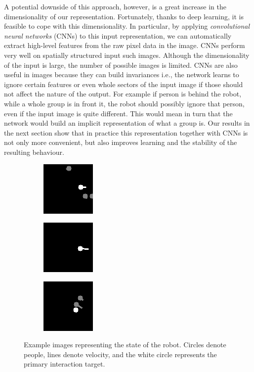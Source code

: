 \documentclass[letterpaper, 10 pt, conference]{ieeeconf}
\begin{document}
A potential downside of this approach, however, is a great increase in the dimensionality of our representation.  Fortunately, thanks to deep learning, it is feasible to cope with this dimensionality.  In particular, by applying \emph{convolutional neural networks} (CNNs) to this input representation, we can automatically extract high-level features from the raw pixel data in the image. CNNs perform very well on spatially structured input such images.  Although the  dimensionality of the input is large, the number of possible images is limited. CNNs are also useful in images because they can build invariances i.e., the network learns to ignore certain features or even whole sectors of the input image if those should not affect the nature of the output. For example if person is behind the robot, while a whole group is in front it, the robot should possibly ignore that person, even if the input image is quite different. This would mean in turn that the network would build an implicit representation of what a group is. Our results in the next section show that in practice this representation together with CNNs is not only more convenient, but also improves learning and the stability of the resulting behaviour.

  	\begin{figure}[tbh]
  	\centering
      \begin{subfigure}[b]{0.30\columnwidth}
    \includegraphics[scale = 0.80]{images/state1.png}
    \label{fig:state1}
  \end{subfigure}
  \begin{subfigure}[b]{0.30\columnwidth}
    \includegraphics[scale = 0.80]{images/state2.png}
       \label{fig:state2}
  \end{subfigure} 
    \begin{subfigure}[b]{0.30\columnwidth}
    \includegraphics[scale = 0.80]{images/state3.png}
       \label{fig:state3}
  \end{subfigure}
  \caption{Example images representing the state of the robot. Circles denote people, lines denote velocity, and the white circle represents the primary interaction target.}

    \vspace{-2mm}
  \label{fig:state}
  \end{figure}
\end{document}
